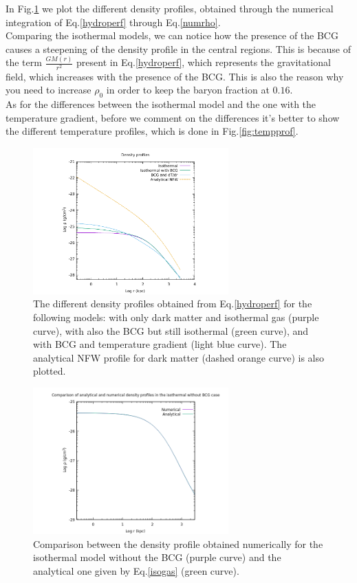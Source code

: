 \documentclass{article}
\begin{document}
In Fig.\ref{fig:densityprofiles} we plot the different density profiles, obtained through the numerical integration of Eq.\eqref{hydroperf} through Eq.\eqref{numrho}. \\
Comparing the isothermal models, we can notice how the presence of the BCG causes a steepening of the density profile in the
central regions. This is because of the term $\frac{GM(r)}{r^{2}}$ present in Eq.\eqref{hydroperf}, which represents the gravitational field, which increases with the presence of the BCG.
This is also the reason why you need to increase $\rho_{0}$ in order to keep the baryon fraction at $0.16$.\\
As for the differences between the isothermal model and the one with the temperature gradient, before we comment on the differences it's better to show the different temperature profiles, which is done in Fig.\ref{fig:tempprof}.
\begin{figure}[H]
	\centering
	\includegraphics[width=0.67\textwidth]{density.pdf}
	\caption{The different density profiles obtained from Eq.\eqref{hydroperf} for the following models: with only dark matter and isothermal gas (purple curve), with also the BCG but still isothermal (green curve), and with BCG and temperature gradient (light blue curve). 
	The analytical NFW profile for dark matter (dashed orange curve) is also plotted.}
	\label{fig:densityprofiles}
\end{figure}
\begin{figure}[H]
	\centering
	\includegraphics[width=0.67\textwidth]{rhoiso.png}
	\caption{Comparison between the density profile obtained numerically for the isothermal model without the BCG (purple curve) and the analytical one given by Eq.\eqref{isogas} (green curve).}
	\label{fig:analvsnum}
\end{figure}
\end{document}
